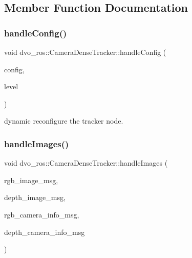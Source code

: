 \subsection{Member Function Documentation}
\mbox{\label{classdvo__ros_1_1_camera_dense_tracker_a7fce574520d9ca9056636506db504912}} 
\subsubsection{\texorpdfstring{handle\+Config()}{handleConfig()}}
{\footnotesize\ttfamily void dvo\+\_\+ros\+::\+Camera\+Dense\+Tracker\+::handle\+Config (\begin{DoxyParamCaption}\item[{dvo\+\_\+ros\+::\+Camera\+Dense\+Tracker\+Config \&}]{config,  }\item[{uint32\+\_\+t}]{level }\end{DoxyParamCaption})}

dynamic reconfigure the tracker node. \mbox{\label{classdvo__ros_1_1_camera_dense_tracker_ad1b549d802d0ebc3627603b3f9ef03b4}} 
\subsubsection{\texorpdfstring{handle\+Images()}{handleImages()}}
{\footnotesize\ttfamily void dvo\+\_\+ros\+::\+Camera\+Dense\+Tracker\+::handle\+Images (\begin{DoxyParamCaption}\item[{const sensor\+\_\+msgs\+::\+Image\+::\+Const\+Ptr \&}]{rgb\+\_\+image\+\_\+msg,  }\item[{const sensor\+\_\+msgs\+::\+Image\+::\+Const\+Ptr \&}]{depth\+\_\+image\+\_\+msg,  }\item[{const sensor\+\_\+msgs\+::\+Camera\+Info\+::\+Const\+Ptr \&}]{rgb\+\_\+camera\+\_\+info\+\_\+msg,  }\item[{const sensor\+\_\+msgs\+::\+Camera\+Info\+::\+Const\+Ptr \&}]{depth\+\_\+camera\+\_\+info\+\_\+msg }\end{DoxyParamCaption})\hspace{0.3cm}{\ttfamily [virtual]}}

